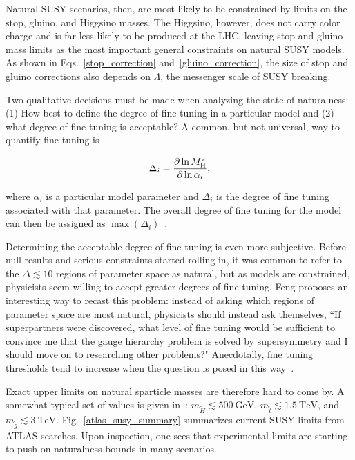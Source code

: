 \documentclass[12pt]{article}
\begin{document}
    Natural SUSY scenarios, then, are most likely to be constrained by limits on the stop, gluino, and Higgsino masses. The Higgsino, however, does not carry color charge and is far less likely to be produced at the LHC, leaving stop and gluino mass limits as the most important general constraints on natural SUSY models. As shown in Eqs.~\ref{stop_correction} and~\ref{gluino_correction}, the size of stop and gluino corrections also depends on $\Lambda$, the messenger scale of SUSY breaking.

    Two qualitative decisions must be made when analyzing the state of naturalness: (1) How best to define the degree of fine tuning in a particular model and (2) what degree of fine tuning is acceptable? A common, but not universal, way to quantify fine tuning is
    
    \noindent \begin{equation}
        \Delta_i = \frac{\partial \ln{M_{\mathrm{H}}^2}}{\partial \ln{\alpha_i}} ,
        \label{fine_tuning}
    \end{equation}

    \noindent where $\alpha_i$ is a particular model parameter and $\Delta_i$ is the degree of fine tuning associated with that parameter. The overall degree of fine tuning for the model can then be assigned as $\max{\left(\Delta_i\right)}$~\cite{cornering}.

    Determining the acceptable degree of fine tuning is even more subjective. Before null results and serious constraints started rolling in, it was common to refer to the $\Delta \lesssim 10$ regions of parameter space as natural, but as models are constrained, physicists seem willing to accept greater degrees of fine tuning. Feng proposes an interesting way to recast this problem: instead of asking which regions of parameter space are most natural, physicists should instead ask themselves, ``If superpartners were discovered, what level of fine tuning would be sufficient to convince me that the gauge hierarchy problem is solved by supersymmetry and I should move on to researching other problems?" Anecdotally, fine tuning thresholds tend to increase when the question is posed in this way~\cite{feng}.

    Exact upper limits on natural sparticle masses are therefore hard to come by. A somewhat typical set of values is given in~\cite{drees_kim}: $m_{\tilde{H}} \lesssim \SI{500}{\giga\electronvolt}$, $m_{\tilde{t}} \lesssim \SI{1.5}{\tera\electronvolt}$, and $m_{\tilde{g}} \lesssim \SI{3}{\tera\electronvolt}$. Fig.~\ref{atlas_susy_summary} summarizes current SUSY limits from ATLAS searches. Upon inspection, one sees that experimental limits are starting to push on naturalness bounds in many scenarios.
\end{document}
